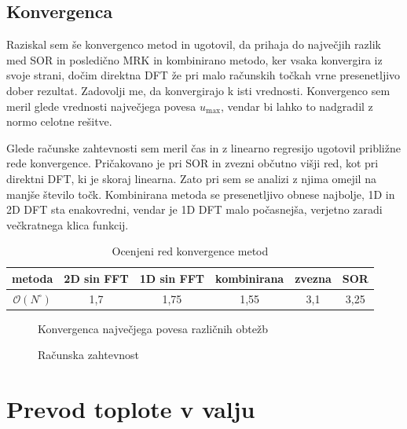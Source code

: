 \subsection{Konvergenca}

Raziskal sem še konvergenco metod in ugotovil, da prihaja do največjih razlik med SOR in posledično MRK in kombinirano metodo, ker vsaka konvergira iz svoje strani, dočim direktna DFT že pri malo računskih točkah vrne presenetljivo dober rezultat. Zadovolji me, da konvergirajo k isti vrednosti. Konvergenco sem meril glede vrednosti največjega povesa $u_{\max}$, vendar bi lahko to nadgradil z normo celotne rešitve.

Glede računske zahtevnosti sem meril čas in z linearno regresijo ugotovil približne rede konvergence. Pričakovano je pri SOR in zvezni občutno višji red, kot pri direktni DFT, ki je skoraj linearna. Zato pri sem se analizi z njima omejil na manjše število točk. Kombinirana metoda se presenetljivo obnese najbolje, 1D in 2D DFT sta enakovredni, vendar je 1D DFT malo počasnejša, verjetno zaradi večkratnega klica funkcij.

\begin{table}[H]
    \centering
    \begin{tabular}{c|c|c|c|c|c}
        metoda & 2D sin FFT & 1D sin FFT & kombinirana & zvezna & SOR \\ \hline
        $\mathcal{O}(N^\square)$ & 1,7 & 1,75 & 1,55 & 3,1 & 3,25
    \end{tabular}
    \caption{Ocenjeni red konvergence metod}
\end{table}
\begin{figure}[H]
    \centering
    \caption{Konvergenca največjega povesa različnih obtežb}
\end{figure}
\begin{figure}[H]
    \centering
    \caption{Računska zahtevnost}
\end{figure}

\section{Prevod toplote v valju}

